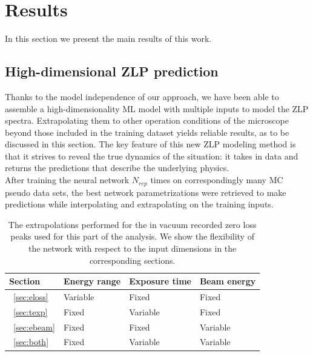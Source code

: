 \section{Results}
\label{sec:results}

In this section we present the main results of this work.

\subsection{High-dimensional ZLP prediction}
Thanks to the model independence of our approach, we have been able to assemble a high-dimensionality ML model
with multiple inputs to model the ZLP spectra. Extrapolating them 
to other operation conditions of the microscope beyond those included
in the training dataset yields reliable results, as to be discussed in this section.
The key feature of this new ZLP modeling method is that it strives to reveal the true dynamics of the situation: it takes in data and returns the predictions that describe the underlying physics. \\

After training the neural network $N_{rep}$ times on correspondingly many MC pseudo data sets, the best network parametrizations were retrieved to make predictions while interpolating and extrapolating on the training inputs. 


\begin{table}[h]
  \renewcommand{\arraystretch}{1.40}
\begin{tabular}{|l|l|l|l|}
\toprule
Section  & Energy range & Exposure time & Beam energy \\ \hline
~\ref{sec:eloss} & Variable     & Fixed         & Fixed       \\
~\ref{sec:texp} & Fixed        & Variable      & Fixed       \\
~\ref{sec:ebeam} & Fixed        & Fixed         & Variable    \\
~\ref{sec:both} & Fixed        & Variable      & Variable    \\ \bottomrule
\end{tabular}
\vspace{0.4cm}
\caption{The extrapolations performed for the in vacuum recorded zero loss peaks used for this part of the analysis. We show the flexibility of the network with respect to the input dimensions in the corresponding sections.}
\label{table:vacuum}
\end{table}


